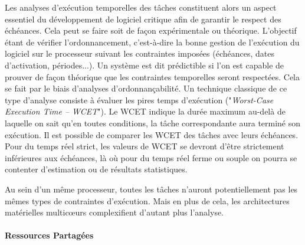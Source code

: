 \documentclass[french, a4paper, 11pt, twoside, pdftex]{StyleThese}
\begin{document}
		Les analyses d'exécution temporelles des tâches constituent alors un aspect essentiel du développement de logiciel critique afin de garantir le respect des échéances. Cela peut se faire soit de façon expérimentale ou théorique. L'objectif étant de vérifier l'ordonnancement, c'est-à-dire la bonne gestion de l'exécution du logiciel sur le processeur suivant les contraintes imposées (échéances, dates d'activation, périodes...). Un système est dit prédictible si l'on est capable de prouver de façon théorique que les contraintes temporelles seront respectées. Cela se fait par le biais d'analyses d'ordonnançabilité. Un technique classique de ce type d'analyse consiste à évaluer les pires temps d'exécution ("\textit{Worst-Case Execution Time -- WCET}"). Le WCET indique la durée maximum au-delà de laquelle on sait qu'en toutes conditions, la tâche correspondante aura terminé son exécution. Il est possible de comparer les WCET des tâches avec leurs échéances. Pour du temps réel strict, les valeurs de WCET se devront d'être strictement inférieures aux échéances, là où pour du temps réel ferme ou souple on pourra se contenter d'estimation ou de résultats statistiques.
				
		Au sein d'un même processeur, toutes les tâches n'auront potentiellement pas les mêmes types de contraintes d'exécution. Mais en plus de cela, les architectures matérielles multicœurs complexifient d'autant plus l'analyse. 
		
		
	\paragraph{Ressources Partagées}
	
\end{document}
